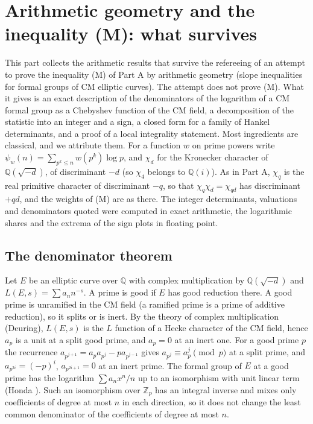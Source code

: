 \section{Arithmetic geometry and the inequality (M): what survives}\label{mqg:sec:ag}

This part collects the arithmetic results that survive the refereeing of an attempt to prove the inequality (M) of Part A by arithmetic geometry (slope inequalities for formal groups of CM elliptic curves). The attempt does not prove (M). What it gives is an exact description of the denominators of the logarithm of a CM formal group as a Chebyshev function of the CM field, a decomposition of the statistic into an integer and a sign, a closed form for a family of Hankel determinants, and a proof of a local integrality statement. Most ingredients are classical, and we attribute them. For a function $w$ on prime powers write $\psi_w(n)=\sum_{p^k\le n}w(p^k)\log p$, and $\chi_d$ for the Kronecker character of $\mathbb Q(\sqrt{-d})$, of discriminant $-d$ (so $\chi_4$ belongs to $\mathbb Q(i)$). As in Part A, $\chi_q$ is the real primitive character of discriminant $-q$, so that $\chi_q\chi_d=\chi_{qd}$ has discriminant $+qd$, and the weights of (M) are as there. The integer determinants, valuations and denominators quoted were computed in exact arithmetic, the logarithmic shares and the extrema of the sign plots in floating point.

\subsection{The denominator theorem}\label{mqg:sec:denom}

Let $E$ be an elliptic curve over $\mathbb Q$ with complex multiplication by $\mathbb Q(\sqrt{-d})$ and $L(E,s)=\sum a_nn^{-s}$. A prime is good if $E$ has good reduction there. A good prime is unramified in the CM field (a ramified prime is a prime of additive reduction), so it splits or is inert. By the theory of complex multiplication (Deuring), $L(E,s)$ is the $L$ function of a Hecke character of the CM field, hence $a_p$ is a unit at a split good prime, and $a_p=0$ at an inert one. For a good prime $p$ the recurrence $a_{p^{j+1}}=a_pa_{p^j}-pa_{p^{j-1}}$ gives $a_{p^j}\equiv a_p^j\pmod p$ at a split prime, and $a_{p^{2i}}=(-p)^i$, $a_{p^{2i+1}}=0$ at an inert prime. The formal group of $E$ at a good prime has the logarithm $\sum a_nx^n/n$ up to an isomorphism with unit linear term (Honda \cite{Honda70}). Such an isomorphism over $\mathbb Z_p$ has an integral inverse and mixes only coefficients of degree at most $n$ in each direction, so it does not change the least common denominator of the coefficients of degree at most $n$.

